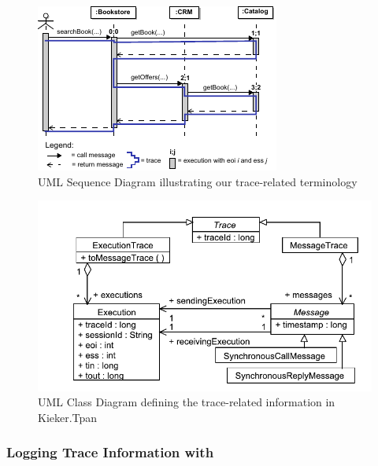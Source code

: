 \begin{figure}\centering
\includegraphics[width=0.96\columnwidth]{figures/eoiessBookstoreDemo-extended-2-combined}
\caption{UML Sequence Diagram illustrating our trace-related terminology}
\label{fig:exampleTraceTerminology}
\end{figure}

\begin{figure}\centering
\includegraphics[scale=0.65]{figures/model/kieker_tracemodel}
\caption{UML Class Diagram defining the trace-related information in Kieker.Tpan}
\label{fig:kiekerTraceRepresentations}
\end{figure}

\subsubsection{Logging Trace Information with \KiekerTpmon{}}

